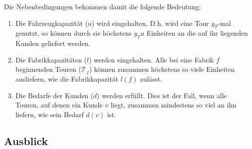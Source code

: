 \documentclass[a4paper,ngerman,11pt,bibtotoc]{scrartcl}
\theoremstyle{definition}
\theoremstyle{plain}
\theoremstyle{remark}
\newcommand{\allTours}{\mathscr{T}}
\renewcommand*\theenumi{\alph{enumi}}
\begin{document}
	Die Nebenbedingungen bekommen damit die folgende Bedeutung:
	\begin{enumerate}\renewcommand{\theenumi}{\arabic{enumi}}
		\item Die Fahrzeugkapazität ($u$) wird eingehalten. D.h. wird eine Tour $y_T$-mal genutzt, so können durch sie höchstens $y_T u$ Einheiten an die auf ihr liegenden Kunden geliefert werden.
		\item Die Fabrikkapazitäten ($l$) werden eingehalten. Alle bei eine Fabrik $f$ beginnenden Touren ($\allTours_f$) können zusammen höchstens so viele Einheiten ausliefern, wie die Fabrikkapazität $l(f)$ zulässt.
		\item Die Bedarfe der Kunden ($d$) werden erfüllt. Dies ist der Fall, wenn alle Touren, auf denen ein Kunde $v$ liegt, zusammen mindestens so viel an ihn liefern, wie sein Bedarf $d(v)$ ist.
	\end{enumerate}


	\subsection{Ausblick}
	
	
	

\newpage	
\listoftodos

\newpage
\nocite{*}
\printbibliography		
			
\end{document}
